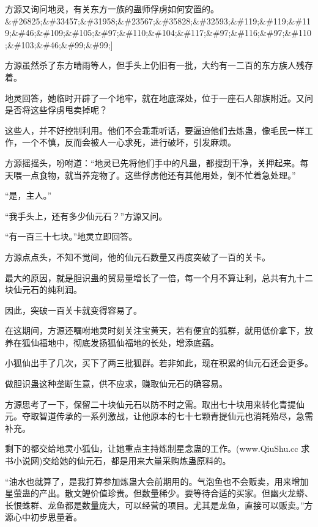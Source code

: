 
\begin{this_body}

方源又询问地灵，有关东方一族的蛊师俘虏如何安置的。\&\#26825;\&\#33457;\&\#31958;\&\#23567;\&\#35828;\&\#32593;\&\#119;\&\#119;\&\#119;\&\#46;\&\#109;\&\#105;\&\#97;\&\#110;\&\#104;\&\#117;\&\#97;\&\#116;\&\#97;\&\#110;\&\#103;\&\#46;\&\#99;\&\#99;]

方源虽然杀了东方晴雨等人，但手头上仍旧有一批，大约有一二百的东方族人残存着。

地灵回答，她临时开辟了一个地牢，就在地底深处，位于一座石人部族附近。又问是否将这些俘虏甩卖掉呢？

这些人，并不好控制利用。他们不会乖乖听话，要逼迫他们去炼蛊，像毛民一样工作，一个不慎，反而会被人一心求死，进行破坏，引发麻烦。

方源摇摇头，吩咐道：“地灵已先将他们手中的凡蛊，都搜刮干净，关押起来。每天喂一点食物，就当养宠物了。这些俘虏他还有其他用处，倒不忙着急处理。”

“是，主人。”

“我手头上，还有多少仙元石？”方源又问。

“有一百三十七块。”地灵立即回答。

方源点点头，不知不觉间，他的仙元石数量又再度突破了一百的关卡。

最大的原因，就是胆识蛊的贸易量增长了一倍，每一个月不算让利，总共有九十二块仙元石的纯利润。

因此，突破一百关卡就变得容易了。

在这期间，方源还嘱咐地灵时刻关注宝黄天，若有便宜的狐群，就用低价拿下，放养在狐仙福地中，彻底发扬狐仙福地的长处，增添底蕴。

小狐仙出手了几次，买下了两三批狐群。若非如此，现在积累的仙元石还会更多。

做胆识蛊这种垄断生意，供不应求，赚取仙元石的确容易。

方源思考了一下，保留二十块仙元石以防不时之需。取出七十块用来转化青提仙元。夺取智道传承的一系列激战，让他原本的七十七颗青提仙元也消耗殆尽，急需补充。

剩下的都交给地灵小狐仙，让她重点主持炼制星念蛊的工作。(www.QiuShu.cc 求书小说网)交给她的仙元石，都是用来大量采购炼蛊原料的。

“油水也就算了，是我打算参加炼蛊大会前期用的。气泡鱼也不会贩卖，用来增加星萤蛊的产出。散文鲤价值珍贵。但数量稀少。要等待合适的买家。但幽火龙蟒、长恨蛛群、龙鱼都是数量庞大，可以经营的项目。尤其是龙鱼，直接可以贩卖。”方源心中初步思量着。


\end{this_body}
